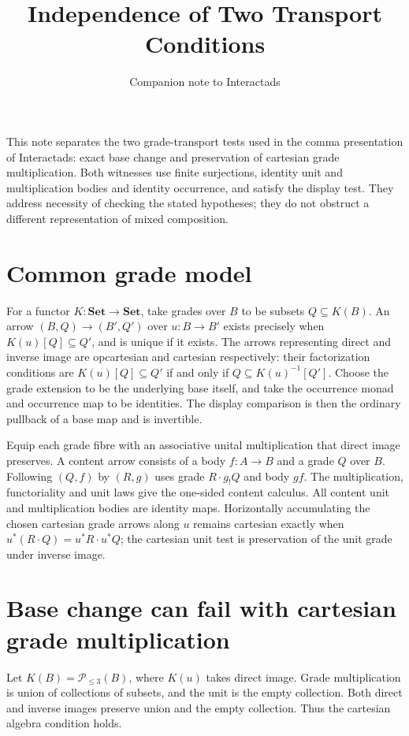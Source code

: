 \documentclass[11pt]{article}
\title{Independence of Two Transport Conditions}
\author{}
\date{Companion note to Interactads}
\begin{document}
\maketitle
\noindent This note separates the two grade-transport tests used in the
comma presentation of Interactads: exact base change and preservation
of cartesian grade multiplication. Both witnesses use finite surjections,
identity unit and multiplication bodies and identity occurrence, and satisfy the display
test. They address necessity of checking the stated hypotheses; they do
not obstruct a different representation of mixed composition.

\section{Common grade model}\label{sec:grade}
For a functor $K:\mathbf{Set}\to\mathbf{Set}$, take grades over $B$ to be
subsets $Q\subseteq K(B)$. An arrow $(B,Q)\to(B',Q')$ over $u:B\to B'$
exists precisely when $K(u)[Q]\subseteq Q'$, and is unique if it exists.
The arrows representing direct and inverse image are opcartesian and
cartesian respectively: their factorization conditions are
$K(u)[Q]\subseteq Q'$ if and only if $Q\subseteq K(u)^{-1}[Q']$.
Choose the grade extension to be the underlying base itself, and take
the occurrence monad and occurrence map to be identities. The display
comparison is then the ordinary pullback of a base map and is invertible.

Equip each grade fibre with an associative unital multiplication that
direct image preserves. A content arrow consists of a body $f:A\to B$
and a grade $Q$ over $B$. Following $(Q,f)$ by $(R,g)$ uses grade
$R\cdot g_!Q$ and body $gf$. The multiplication, functoriality and unit
laws give the one-sided content calculus. All content unit and
multiplication bodies are identity maps. Horizontally accumulating the
chosen cartesian grade arrows along $u$ remains cartesian exactly when
$u^*(R\cdot Q)=u^*R\cdot u^*Q$; the cartesian unit test is preservation
of the unit grade under inverse image.

\section{Base change can fail with cartesian grade multiplication}\label{sec:bc}
Let $K(B)=\mathcal P_{\le3}(B)$, where $K(u)$ takes direct image.
Grade multiplication is union of collections of subsets, and the unit
is the empty collection. Both direct and inverse images preserve union
and the empty collection. Thus the cartesian algebra condition holds.
\end{document}
